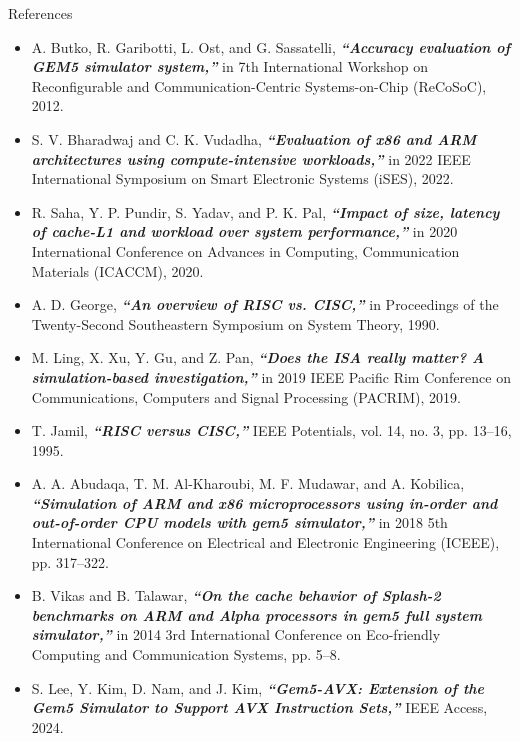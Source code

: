 \begin{frame}[allowframebreaks]{References}
  \begin{itemize}
    \item[{\bf [1]}] A. Butko, R. Garibotti, L. Ost, and G. Sassatelli, \textbf{\textit{“Accuracy evaluation of GEM5 simulator system,”}} in 7th International Workshop on Reconfigurable and Communication-Centric Systems-on-Chip (ReCoSoC), 2012.
    
    \item[{\bf [2]}] S. V. Bharadwaj and C. K. Vudadha, \textbf{\textit{“Evaluation of x86 and ARM architectures using compute-intensive workloads,”}} in 2022 IEEE International Symposium on Smart Electronic Systems (iSES), 2022.
    
    \item[{\bf [3]}] R. Saha, Y. P. Pundir, S. Yadav, and P. K. Pal, \textbf{\textit{“Impact of size, latency of cache-L1 and workload over system performance,”}} in 2020 International Conference on Advances in Computing, Communication Materials (ICACCM), 2020.
    
    \item[{\bf [4]}] A. D. George, \textbf{\textit{“An overview of RISC vs. CISC,”}} in Proceedings of the Twenty-Second Southeastern Symposium on System Theory, 1990.
    
    \item[{\bf [5]}] M. Ling, X. Xu, Y. Gu, and Z. Pan, \textbf{\textit{“Does the ISA really matter? A simulation-based investigation,”}} in 2019 IEEE Pacific Rim Conference on Communications, Computers and Signal Processing (PACRIM), 2019.
    
    \item[{\bf [6]}] T. Jamil, \textbf{\textit{“RISC versus CISC,”}} IEEE Potentials, vol. 14, no. 3, pp. 13–16, 1995.
    
    \item[{\bf [7]}] A. A. Abudaqa, T. M. Al-Kharoubi, M. F. Mudawar, and A. Kobilica, \textbf{\textit{“Simulation of ARM and x86 microprocessors using in-order and out-of-order CPU models with gem5 simulator,”}} in 2018 5th International Conference on Electrical and Electronic Engineering (ICEEE), pp. 317–322.
    
    \item[{\bf [8]}] B. Vikas and B. Talawar, \textbf{\textit{“On the cache behavior of Splash-2 benchmarks on ARM and Alpha processors in gem5 full system simulator,”}} in 2014 3rd International Conference on Eco-friendly Computing and Communication Systems, pp. 5–8.
    
    \item[{\bf [9]}] S. Lee, Y. Kim, D. Nam, and J. Kim, \textbf{\textit{“Gem5-AVX: Extension of the Gem5 Simulator to Support AVX Instruction Sets,”}} IEEE Access, 2024.
  \end{itemize}
\end{frame}
